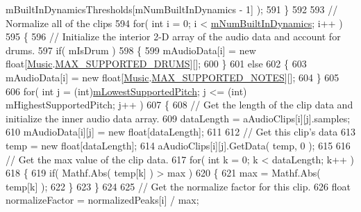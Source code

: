 \begin{DoxyCodeInclude}
{{      mBuiltInDynamicsThresholds[mNumBuiltInDynamics - 1] );
591             \}
592 
593             \textcolor{comment}{// Normalize all of the clips}
594             \textcolor{keywordflow}{for}( \textcolor{keywordtype}{int} i = 0; i < \hyperlink{group___v_i_base_pro_var_gac265f64f759d267ee1e1680f8d387011}{mNumBuiltInDynamics}; i++ )
595             \{
596                 \textcolor{comment}{// Initialize the interior 2-D array of the audio data and account for drums.}
597                 \textcolor{keywordflow}{if}( mIsDrum )
598                 \{
599                     mAudioData[i] = \textcolor{keyword}{new} \textcolor{keywordtype}{float}[\hyperlink{class_music}{Music}.\hyperlink{group___music_constants_gabce1a1ac5b9b6355af6bd7fb3868467a}{MAX\_SUPPORTED\_DRUMS}][];
600                 \}
601                 \textcolor{keywordflow}{else}
602                 \{
603                     mAudioData[i] = \textcolor{keyword}{new} \textcolor{keywordtype}{float}[\hyperlink{class_music}{Music}.\hyperlink{group___music_constants_gaaf07da909a12e9fec0e43b70864f27b7}{MAX\_SUPPORTED\_NOTES}][];
604                 \}
605 
606                 \textcolor{keywordflow}{for}( \textcolor{keywordtype}{int} j = (\textcolor{keywordtype}{int})\hyperlink{group___v_i_base_pro_var_ga3cae52b1bcc0178a8a6b03c7aaf7aac8}{mLowestSupportedPitch}; j <= (int)
      mHighestSupportedPitch; j++ )
607                 \{
608                     \textcolor{comment}{// Get the length of the clip data and initialize the inner audio data array. }
609                     dataLength = aAudioClips[i][j].samples;
610                     mAudioData[i][j] = \textcolor{keyword}{new} \textcolor{keywordtype}{float}[dataLength];
611 
612                     \textcolor{comment}{// Get this clip's data}
613                     temp = \textcolor{keyword}{new} \textcolor{keywordtype}{float}[dataLength];
614                     aAudioClips[i][j].GetData( temp, 0 );
615 
616                     \textcolor{comment}{// Get the max value of the clip data.}
617                     \textcolor{keywordflow}{for}( \textcolor{keywordtype}{int} k = 0; k < dataLength; k++ )
618                     \{
619                         \textcolor{keywordflow}{if}( Mathf.Abs( temp[k] ) > max )
620                         \{
621                             max = Mathf.Abs( temp[k] );
622                         \}
623                     \}
624 
625                     \textcolor{comment}{// Get the normalize factor for this clip.}
626                     \textcolor{keywordtype}{float} normalizeFactor = normalizedPeaks[i] / max;
}}
\end{DoxyCodeInclude}
